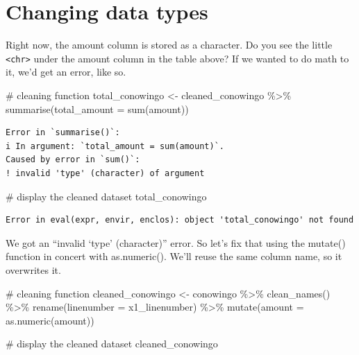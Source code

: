 \documentclass[
  letterpaper,
  DIV=11,
  numbers=noendperiod]{scrreprt}
\newenvironment{Shaded}{\begin{snugshade}}{\end{snugshade}}
\newcommand{\AttributeTok}[1]{\textcolor[rgb]{0.40,0.45,0.13}{#1}}
\newcommand{\CommentTok}[1]{\textcolor[rgb]{0.37,0.37,0.37}{#1}}
\newcommand{\FunctionTok}[1]{\textcolor[rgb]{0.28,0.35,0.67}{#1}}
\newcommand{\NormalTok}[1]{\textcolor[rgb]{0.00,0.23,0.31}{#1}}
\newcommand{\OtherTok}[1]{\textcolor[rgb]{0.00,0.23,0.31}{#1}}
\newcommand{\SpecialCharTok}[1]{\textcolor[rgb]{0.37,0.37,0.37}{#1}}
\begin{document}
\hypertarget{changing-data-types}{%
\section{Changing data types}\label{changing-data-types}}

Right now, the amount column is stored as a character. Do you see the
little \texttt{\textless{}chr\textgreater{}} under the amount column in
the table above? If we wanted to do math to it, we'd get an error, like
so.

\begin{Shaded}
\begin{Highlighting}[]
\CommentTok{\# cleaning function}
\NormalTok{total\_conowingo }\OtherTok{\textless{}{-}}\NormalTok{ cleaned\_conowingo }\SpecialCharTok{\%\textgreater{}\%}
  \FunctionTok{summarise}\NormalTok{(}\AttributeTok{total\_amount =} \FunctionTok{sum}\NormalTok{(amount))}
\end{Highlighting}
\end{Shaded}

\begin{verbatim}
Error in `summarise()`:
i In argument: `total_amount = sum(amount)`.
Caused by error in `sum()`:
! invalid 'type' (character) of argument
\end{verbatim}

\begin{Shaded}
\begin{Highlighting}[]
\CommentTok{\# display the cleaned dataset}
\NormalTok{total\_conowingo}
\end{Highlighting}
\end{Shaded}

\begin{verbatim}
Error in eval(expr, envir, enclos): object 'total_conowingo' not found
\end{verbatim}

We got an ``invalid `type' (character)'' error. So let's fix that using
the mutate() function in concert with as.numeric(). We'll reuse the same
column name, so it overwrites it.

\begin{Shaded}
\begin{Highlighting}[]
\CommentTok{\# cleaning function}
\NormalTok{cleaned\_conowingo }\OtherTok{\textless{}{-}}\NormalTok{ conowingo }\SpecialCharTok{\%\textgreater{}\%}
  \FunctionTok{clean\_names}\NormalTok{() }\SpecialCharTok{\%\textgreater{}\%}
  \FunctionTok{rename}\NormalTok{(}\AttributeTok{linenumber =}\NormalTok{ x1\_linenumber) }\SpecialCharTok{\%\textgreater{}\%}
  \FunctionTok{mutate}\NormalTok{(}\AttributeTok{amount =} \FunctionTok{as.numeric}\NormalTok{(amount))}


\CommentTok{\# display the cleaned dataset}
\NormalTok{cleaned\_conowingo}
\end{Highlighting}
\end{Shaded}
\end{document}

